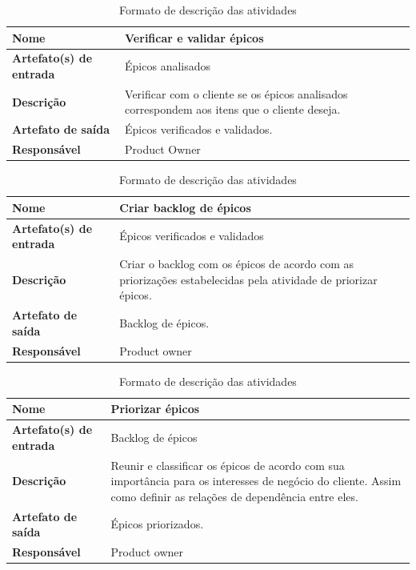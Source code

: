 \begin{table}[h]
    \centering
    \label{descricaoAtividades}
    \caption{Formato de descrição das atividades}
        \begin{tabular}{|l|p{10cm}|}
        \hline
        \textbf{Nome} & Verificar e validar épicos \\
        \hline
        \textbf{Artefato(s) de entrada} & Épicos analisados \\
        \hline
        \textbf{Descrição} & Verificar com o cliente se os épicos analisados correspondem aos itens que o cliente deseja. \\
        \hline
        \textbf{Artefato de saída} & Épicos verificados e validados. \\
        \hline
        \textbf{Responsável} & Product Owner \\
        \hline
    \end{tabular}
\end{table}

\begin{table}[h]
    \centering
    \label{descricaoAtividades}
    \caption{Formato de descrição das atividades}
        \begin{tabular}{|l|p{10cm}|}
        \hline
        \textbf{Nome} & Criar backlog de épicos \\
        \hline
        \textbf{Artefato(s) de entrada} & Épicos verificados e validados \\
        \hline
        \textbf{Descrição} & Criar o backlog com os épicos de acordo com as priorizações estabelecidas pela atividade de priorizar épicos. \\
        \hline
        \textbf{Artefato de saída} & Backlog de épicos. \\
        \hline
        \textbf{Responsável} & Product owner \\
        \hline
    \end{tabular}
\end{table}

\begin{table}[h]
    \centering
    \label{descricaoAtividades}
    \caption{Formato de descrição das atividades}
        \begin{tabular}{|l|p{10cm}|}
        \hline
        \textbf{Nome} & Priorizar épicos \\
        \hline
        \textbf{Artefato(s) de entrada} & Backlog de épicos \\
        \hline
        \textbf{Descrição} & Reunir e classificar os épicos de acordo com sua importância para os interesses de negócio do cliente. Assim como definir as relações de dependência entre eles. \\
        \hline
        \textbf{Artefato de saída} & Épicos priorizados. \\
        \hline
        \textbf{Responsável} & Product owner \\
        \hline
    \end{tabular}
\end{table}

